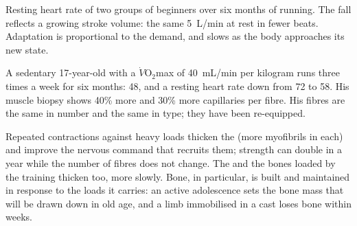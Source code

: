 \begin{omfigure}

{\small Resting heart rate of two groups of beginners over six months
of running. The fall reflects a growing stroke volume: the same
\qty{5}{L/min} at rest in fewer beats. Adaptation is proportional to
the demand, and slows as the body approaches its new state.}
\end{omfigure}

\begin{example}\label{ex:g10:sport-and-health:numbers}
A sedentary 17-year-old with a $\dot V\!\mathrm{O_2}$max of
\qty{40}{mL/min} per kilogram runs three times a week for six months:
\num{48}, and a resting heart rate down from 72 to 58. His muscle
biopsy shows 40\% more  and 30\% more capillaries per
fibre. His fibres are the same in number and the same in type; they
have been re-equipped.
\end{example}

\begin{proposition}\label{prop:g10:sport-and-health:strength}
Repeated contractions against heavy loads thicken the 
(more myofibrils in each) and improve the nervous command that
recruits them; strength can double in a year while the number of
fibres does not change. The  and the bones loaded by the
training thicken too, more slowly. Bone, in particular, is built and
maintained in response to the loads it carries: an active adolescence
sets the bone mass that will be drawn down in old age, and a limb
immobilised in a cast loses bone within weeks.
\end{proposition}
\admitted


